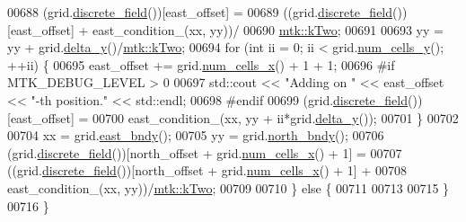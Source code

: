 \begin{DoxyCode}
00688     (grid.\hyperlink{classmtk_1_1UniStgGrid2D_a3e72d59843a3f9c5e47da07e5850dfe0}{discrete\_field}())[east\_offset] =
00689       ((grid.\hyperlink{classmtk_1_1UniStgGrid2D_a3e72d59843a3f9c5e47da07e5850dfe0}{discrete\_field}())[east\_offset] + east\_condition\_(xx, yy))/
00690         \hyperlink{group__c01-roots_gaf39c2d851a2db744f4feb1c5ab3ec2cf}{mtk::kTwo};
00691 
00693     yy = yy + grid.\hyperlink{classmtk_1_1UniStgGrid2D_a65a78cfc80ffdbeb282ed57af4dc5cb4}{delta\_y}()/\hyperlink{group__c01-roots_gaf39c2d851a2db744f4feb1c5ab3ec2cf}{mtk::kTwo};
00694     \textcolor{keywordflow}{for} (\textcolor{keywordtype}{int} ii = 0; ii < grid.\hyperlink{classmtk_1_1UniStgGrid2D_aed05a801cc9a76dba0ff203cea58a61a}{num\_cells\_y}(); ++ii) \{
00695       east\_offset += grid.\hyperlink{classmtk_1_1UniStgGrid2D_a2d182866a398aba8e4829590e85bf939}{num\_cells\_x}() + 1 + 1;
00696 \textcolor{preprocessor}{      #if MTK\_DEBUG\_LEVEL > 0}
00697       std::cout << \textcolor{stringliteral}{"Adding on "} << east\_offset << \textcolor{stringliteral}{"-th position."} << std::endl;
00698 \textcolor{preprocessor}{      #endif}
00699       (grid.\hyperlink{classmtk_1_1UniStgGrid2D_a3e72d59843a3f9c5e47da07e5850dfe0}{discrete\_field}())[east\_offset] =
00700         east\_condition\_(xx, yy + ii*grid.\hyperlink{classmtk_1_1UniStgGrid2D_a65a78cfc80ffdbeb282ed57af4dc5cb4}{delta\_y}());
00701     \}
00702 
00704     xx = grid.\hyperlink{classmtk_1_1UniStgGrid2D_a03f689eb29a6369b82ce1207c655d5ff}{east\_bndy}();
00705     yy = grid.\hyperlink{classmtk_1_1UniStgGrid2D_afe1ead253cdeb5503e0489eba8fd84e2}{north\_bndy}();
00706     (grid.\hyperlink{classmtk_1_1UniStgGrid2D_a3e72d59843a3f9c5e47da07e5850dfe0}{discrete\_field}())[north\_offset + grid.\hyperlink{classmtk_1_1UniStgGrid2D_a2d182866a398aba8e4829590e85bf939}{num\_cells\_x}() + 1] =
00707       ((grid.\hyperlink{classmtk_1_1UniStgGrid2D_a3e72d59843a3f9c5e47da07e5850dfe0}{discrete\_field}())[north\_offset + grid.\hyperlink{classmtk_1_1UniStgGrid2D_a2d182866a398aba8e4829590e85bf939}{num\_cells\_x}() + 1] +
00708       east\_condition\_(xx, yy))/\hyperlink{group__c01-roots_gaf39c2d851a2db744f4feb1c5ab3ec2cf}{mtk::kTwo};
00709 
00710   \} \textcolor{keywordflow}{else} \{
00711 
00713 
00715   \}
00716 \}
\end{DoxyCode}
